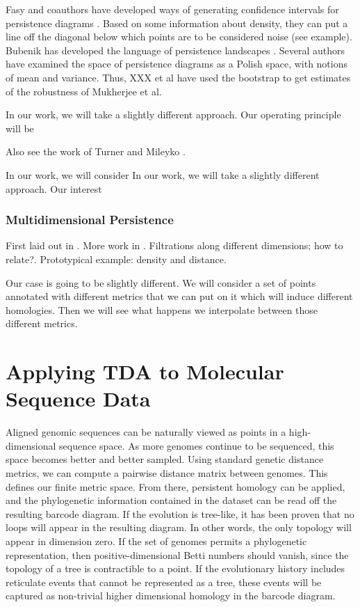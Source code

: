 Fasy and coauthors have developed ways of generating confidence intervals for persistence diagrams \citep{Fasy:2014}.
Based on some information about density, they can put a line off the diagonal below which points are to be considered noise (see example).
Bubenik has developed the language of persistence landscapes \cite{Bubenik:2007ux,Bubenik2015:um}.  
Several authors have examined the space of persistence diagrams as a Polish space, with notions of mean and variance.
Thus, XXX et al have used the bootstrap to get estimates of the robustness of 
Mukherjee et al.

In our work, we will take a slightly different approach.
Our operating principle will be 

Also see the work of Turner \cite{Turner:2012wb} and Mileyko \cite{Mileyko:2011jm}.

In our work, we will consider
In our work, we will take a slightly different approach.
Our interest
\kje{[Expand.]}

\subsubsection{Multidimensional Persistence}
\label{subsubsec:ph_multidim}

First laid out in \cite{Carlsson:2009b}.
More work in \cite{Lesnick:2012uv}.
Filtrations along different dimensions; how to relate?.
Prototypical example: density and distance.

Our case is going to be slightly different.
We will consider a set of points annotated with different metrics that we can put on it which will induce different homologies.
Then we will see what happens we interpolate between those different metrics.

\section{Applying TDA to Molecular Sequence Data}

Aligned genomic sequences can be naturally viewed as points in a high-dimensional sequence space.
As more genomes continue to be sequenced, this space becomes better and better sampled.
Using standard genetic distance metrics, we can compute a pairwise distance matrix between genomes.
This defines our finite metric space.
From there, persistent homology can be applied, and the phylogenetic information contained in the dataset can be read off the resulting barcode diagram.
If the evolution is tree-like, it has been proven that no loops will appear in the resulting diagram.
In other words, the only topology will appear in dimension zero.
If the set of genomes permits a phylogenetic representation, then positive-dimensional Betti numbers should vanish, since the topology of a tree is contractible to a point. 
If the evolutionary history includes reticulate events that cannot be represented as a tree, these events will be captured as non-trivial higher dimensional homology in the barcode diagram.

